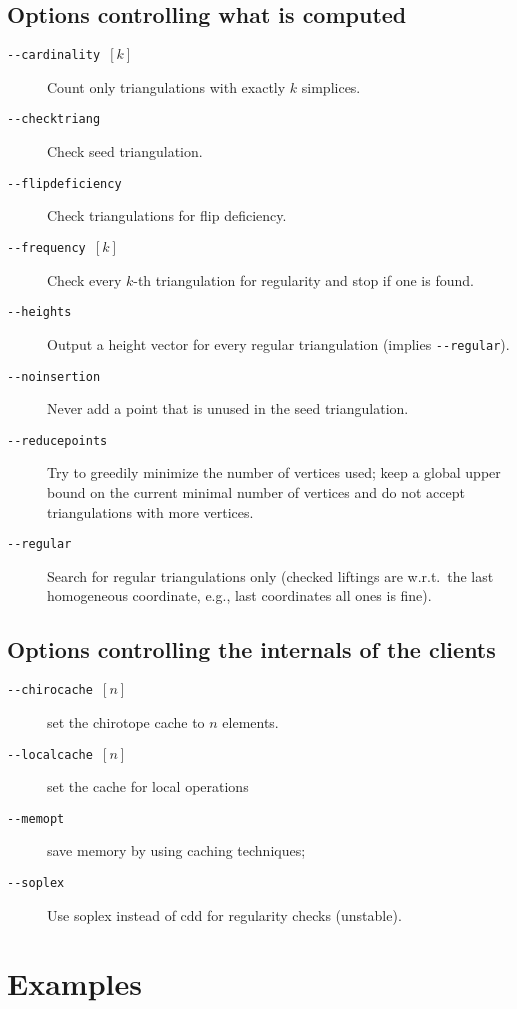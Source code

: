 \documentclass[12pt,a4paper]{article}
\begin{document}
\subsection*{Options controlling what is computed}
\begin{description}
\item[\texttt{-}\texttt{-cardinality $[k]$}] Count only triangulations with exactly $k$ simplices.
\item[\texttt{-}\texttt{-checktriang}] Check seed triangulation.
\item[\texttt{-}\texttt{-flipdeficiency}] Check triangulations for flip deficiency.
\item[\texttt{-}\texttt{-frequency $[k]$}] Check every $k$-th triangulation
  for regularity and stop if one is found.
\item[\texttt{-}\texttt{-heights}] Output a height vector for every regular triangulation (implies
  \texttt{-}\texttt{-regular}).
\item[\texttt{-}\texttt{-noinsertion}] Never add a point that is unused in the seed triangulation.
\item[\texttt{-}\texttt{-reducepoints}] Try to greedily minimize the number of vertices used; keep
  a global upper bound on the current minimal number of vertices and do not
  accept triangulations with more vertices.
\item[\texttt{-}\texttt{-regular}] Search for regular triangulations only (checked liftings are
  w.r.t.\ the last homogeneous coordinate, e.g., last coordinates all ones is
  fine).
\end{description}

\subsection*{Options controlling the internals of the clients}
\begin{description}
\item[\texttt{-}\texttt{-chirocache $[n]$}] set the chirotope cache to $n$ elements.
\item[\texttt{-}\texttt{-localcache $[n]$}] set the cache for local operations
\item[\texttt{-}\texttt{-memopt}] save memory by using caching techniques;
\item[\texttt{-}\texttt{-soplex}] Use soplex instead of cdd for regularity checks (unstable).
\end{description}


\section{Examples}
\label{sec:examples}
\end{document}
